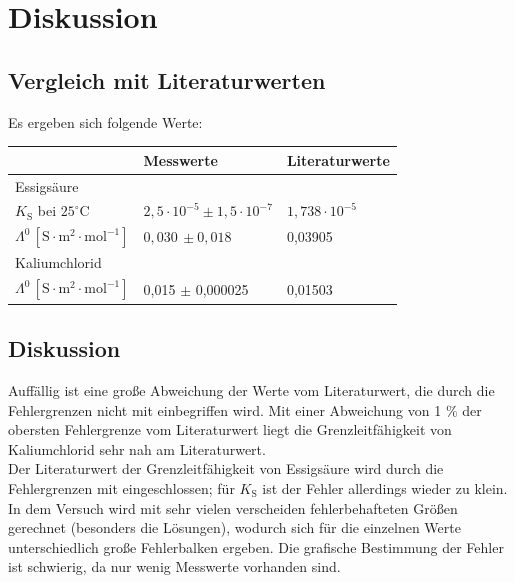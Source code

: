 \documentclass[12pt,a4paper,titlepage,headinclude,bibtotoc]{scrartcl}
\begin{document}
\newpage 

\section{Diskussion}
\subsection{Vergleich mit Literaturwerten}

Es ergeben sich folgende Werte:\\

\begin{table} [h]
\centering 
\begin{tabular}{p{3cm}|p{5cm}p{5cm}}
& Messwerte & Literaturwerte\footnotemark\\
\hline
Essigsäure & &\\
 $K_{\mathrm{S}}$  bei $25^\circ\text{C}$ & $2,5 \cdot 10^{-5} \pm 1,5 \cdot 10^{-7}$& $1,738 \cdot 10^{-5}$\\
$\Lambda^0\, [\mathrm{S} \cdot \mathrm{m^2} \cdot \mathrm{mol^{-1}}]$ & $ 0,030\, \pm 0,018 $& 0,03905\\
\hline
Kaliumchlorid & &\\
$\Lambda^0\, [\mathrm{S} \cdot \mathrm{m^2} \cdot \mathrm{mol^{-1}}]$ & 0,015 $\pm$ 0,000025 & 0,01503\\
\end{tabular}
\end{table}



\subsection{Diskussion}

Auffällig ist eine große Abweichung der Werte vom Literaturwert, die durch die Fehlergrenzen nicht mit einbegriffen wird. Mit einer Abweichung von 1 $\%$ der obersten Fehlergrenze vom Literaturwert liegt die Grenzleitfähigkeit von Kaliumchlorid sehr nah am Literaturwert. \\
Der Literaturwert der Grenzleitfähigkeit von Essigsäure wird durch die Fehlergrenzen mit eingeschlossen; für $K_\mathrm{S}$ ist der Fehler allerdings wieder zu klein.\\

In dem Versuch wird mit sehr vielen verscheiden fehlerbehafteten Größen gerechnet (besonders die Lösungen), wodurch sich für die einzelnen Werte unterschiedlich große Fehlerbalken ergeben. Die grafische Bestimmung der Fehler ist schwierig, da nur wenig Messwerte vorhanden sind. \\
\end{document}
